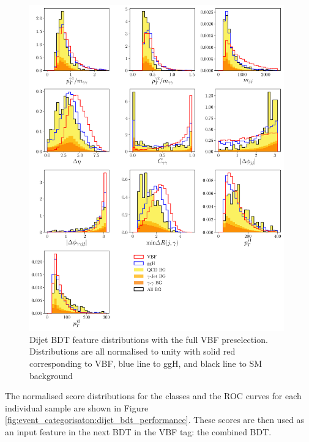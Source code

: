 \begin{figure}[h!]
    \includegraphics[width=0.98\textwidth]{figures/event_selection/dijet_BDT_features_splitBG_PS.pdf}
    \caption{Dijet BDT feature distributions with the full VBF preselection. Distributions are all normalised to unity with solid red corresponding to VBF, blue line to ggH, and black line to SM background}
    \label{fig:event_categorisaton:dijet_bdt_features}
\end{figure}

The normalised score distributions for the classes and the ROC curves for each individual sample are shown in Figure \ref{fig:event_categorisaton:dijet_bdt_performance}.
These scores are then used as an input feature in the next BDT in the VBF tag: the combined BDT. 

